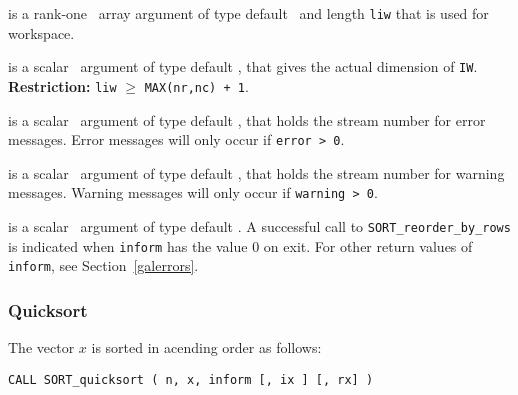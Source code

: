 \documentclass{galahad}
\newcommand{\packagename}{SORT}
\begin{document}
\begin{description}
  is a rank-one \intentout\ array argument of type default
\integer\ and length {\tt liw} that is used for workspace.

  is a scalar \intentin\ argument of type default
\integer, that gives the actual dimension of {\tt IW}.
{\bf Restriction:} {\tt liw} $\geq$ {\tt MAX(nr,nc) + 1}.

 is a scalar \intentin\ argument of type default
\integer, that holds the stream number for error messages.
Error messages will only occur if {\tt error > 0}.

 is a scalar \intentin\ argument of type default
\integer, that holds the stream number for warning messages.
Warning messages will only occur if {\tt warning > 0}.

 is a scalar \intentout\ argument of type default \integer.
A successful call to {\tt \packagename\_reorder\_by\_rows}
is indicated when {\tt inform} has the value 0 on exit.
For other return values of {\tt inform}, see Section~\ref{galerrors}.

\end{description}

\subsubsection{Quicksort}

The vector $x$ is sorted in acending order as follows:
\vspace*{1mm}

\hspace{8mm}
{\tt CALL \packagename\_quicksort ( n, x, inform [, ix ] [, rx] )}
\end{document}
